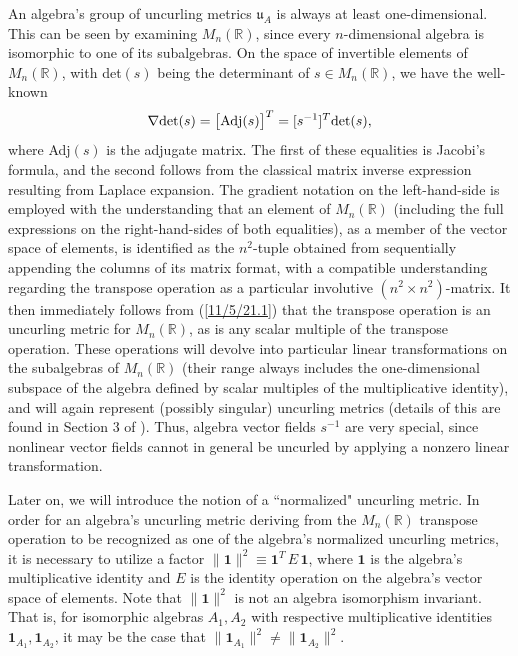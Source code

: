 \documentclass{amsart}
\numberwithin{equation}{section}
\theoremstyle{definition}
\numberwithin{theorem}{section}
\begin{document}
An algebra's group of uncurling metrics $\mathfrak{u}_A$ is always at least one-dimensional.  This can be seen by examining $M_n(\mathbb{R})$, since every $n$-dimensional algebra is isomorphic to one of its subalgebras.  On the space of invertible elements of $M_n(\mathbb{R})$, with det$(s)$ being the determinant of $s\in M_n(\mathbb{R})$, we have the well-known
  \begin{equation}\label{11/5/21.1} \nabla \mbox{det}(s) = \big[{\rm Adj}(s)\big]^T = [s^{-1}]^T\mbox{det}(s),\end{equation} where Adj$(s)$ is the adjugate matrix.  The first of these equalities is Jacobi's formula, and the second follows from the classical matrix inverse expression resulting from Laplace expansion.  The gradient notation on the left-hand-side is employed with the understanding that an element of $M_n(\mathbb{R})$ (including the full expressions on the right-hand-sides of both equalities), as a member of the vector space of elements, is identified as the $n^2$-tuple obtained from sequentially appending the columns of its matrix format, with a compatible understanding regarding the transpose operation as a particular involutive $(n^2\times n^2)$-matrix.  It then immediately follows from (\ref{11/5/21.1}) that the transpose operation is an uncurling metric for $M_n(\mathbb{R})$, as is any scalar multiple of the transpose operation.  These operations will devolve into particular linear transformations on the subalgebras of $M_n(\mathbb{R})$ (their range always includes the one-dimensional subspace of the algebra defined by scalar multiples of the multiplicative identity), and will again represent (possibly singular) uncurling metrics (details of this are found in Section 3 of \cite{fgreensite:2023}).
  Thus, algebra vector fields $s^{-1}$ are very special, since nonlinear vector fields cannot in general be uncurled by applying a nonzero linear transformation.
    
    

Later on, we will introduce the notion of a ``normalized" uncurling metric.  In order for an algebra's uncurling metric deriving from the $M_n(\mathbb{R})$ transpose operation to be recognized as one of the algebra's normalized uncurling metrics, it is necessary to utilize a factor $\|\mathbf{1}\|^2 \equiv \mathbf{1}^T \,E\, \mathbf{1}$, where $\mathbf{1}$ is the algebra's multiplicative identity and $E$ is the identity operation on the algebra's vector space of elements.  Note that $\|\mathbf{1}\|^2$ is not an algebra isomorphism invariant.  That is, for isomorphic algebras $A_1,A_2$ with respective multiplicative identities $\mathbf{1}_{A_1}, \mathbf{1}_{A_2}$, it may be the case that $\|\mathbf{1}_{A_1}\|^2 \ne \|\mathbf{1}_{A_2}\|^2$.
\end{document}

